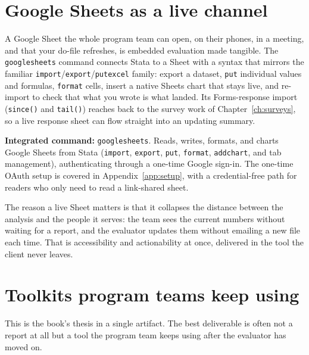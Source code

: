 \documentclass[
    a4paper,
    fontsize=10pt,
    twoside=true,
    numbers=noenddot,
]{kaobook}
\begin{document}
\section{Google Sheets as a live channel}
A Google Sheet the whole program team can open, on their phones, in a meeting, and that your do-file refreshes, is embedded evaluation made tangible. The \texttt{googlesheets} command connects Stata to a Sheet with a syntax that mirrors the familiar \texttt{import}/\texttt{export}/\texttt{putexcel} family: export a dataset, \texttt{put} individual values and formulas, \texttt{format} cells, insert a native Sheets chart that stays live, and re-import to check that what you wrote is what landed. Its Forms-response import (\texttt{since()} and \texttt{tail()}) reaches back to the survey work of Chapter~\ref{ch:surveys}, so a live response sheet can flow straight into an updating summary.

\begin{kaobox}[frametitle=Package Integration: \texttt{googlesheets}]
\textbf{Integrated command:} \texttt{googlesheets}. Reads, writes, formats, and charts Google Sheets from Stata (\texttt{import}, \texttt{export}, \texttt{put}, \texttt{format}, \texttt{addchart}, and tab management), authenticating through a one-time Google sign-in. The one-time OAuth setup is covered in Appendix~\ref{app:setup}, with a credential-free path for readers who only need to read a link-shared sheet.
\end{kaobox}

The reason a live Sheet matters is that it collapses the distance between the analysis and the people it serves: the team sees the current numbers without waiting for a report, and the evaluator updates them without emailing a new file each time. That is accessibility and actionability at once, delivered in the tool the client never leaves.

\section{Toolkits program teams keep using}\label{sec:teamtoolkit}
This is the book's thesis in a single artifact. The best deliverable is often not a report at all but a tool the program team keeps using after the evaluator has moved on.
\end{document}
